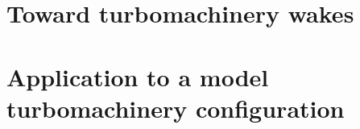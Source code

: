 \section{Toward turbomachinery wakes}
\label{sec:wake_fct}


\section{Application to a model turbomachinery configuration}
\label{sec:model_tbm}


